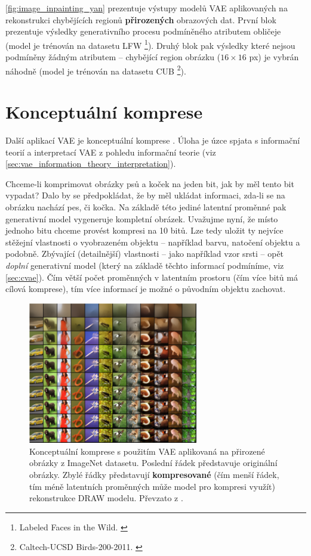 \autoref{fig:image_inpainting_yan} prezentuje výstupy modelů VAE aplikovaných na rekonstrukci chybějících regionů \textbf{přirozených} obrazových dat.
První blok prezentuje výsledky generativního procesu podmíněného atributem obličeje (model je trénován na datasetu LFW \footnote{Labeled Faces in the Wild. \cite{Huang2012}}).
Druhý blok pak výsledky které nejsou podmíněny žádným atributem – chybějící region obrázku ($16\times16$ px) je vybrán náhodně (model je trénován na datasetu CUB \footnote{Caltech-UCSD Birds-200-2011. \cite{Wah2011}}).

\newpage
\section{Konceptuální komprese}
Další aplikací VAE je konceptuální komprese \cite{Gregor2016}. Úloha je úzce spjata s informační teorií a interpretací VAE z pohledu informační teorie (viz \autoref{sec:vae_information_theory_interpretation}).

Chceme-li komprimovat obrázky psů a koček na jeden bit, jak by měl tento bit vypadat?
Dalo by se předpokládat, že by měl ukládat informaci, zda-li se na obrázku nachází pes, či kočka. 
Na základě této jediné latentní proměnné pak generativní model vygeneruje kompletní obrázek.
Uvažujme nyní, že místo jednoho bitu chceme provést kompresi na 10 bitů.
Lze tedy uložit ty nejvíce stěžejní vlastnosti o vyobrazeném objektu  – například barvu, natočení objektu a podobně.
Zbývající (detailnější) vlastnosti – jako například vzor srsti – opět \emph{doplní} generativní model (který na základě těchto informací podmíníme, viz \autoref{sec:cvae}).
Čím větší počet proměnných v latentním prostoru (čím více bitů má cílová komprese), tím více informací je možné o původním objektu zachovat. \cite{Gregor2016}

\begin{figure}[H]
    \centering
    \includegraphics[width=0.66\textwidth]{figures/applications/conceptual_compression_gregor.png}
    \caption{Konceptuální komprese s použitím VAE aplikovaná na přirozené obrázky z ImageNet datasetu. Poslední řádek představuje originální obrázky. Zbylé řádky představují \textbf{kompresované} (čím menší řádek, tím méně latentních proměnných může model pro kompresi využít) rekonstrukce DRAW modelu. Převzato z \textcite{Gregor2016}.}
    \label{fig:conceptual_compression_gregor}
\end{figure}

